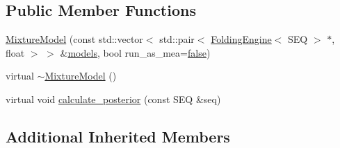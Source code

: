 \subsection*{Public Member Functions}
\begin{DoxyCompactItemize}
\item 
\hyperlink{class_mixture_model_a748180f79cd3465a2737550e49baca9b}{Mixture\+Model} (const std\+::vector$<$ std\+::pair$<$ \hyperlink{class_folding_engine}{Folding\+Engine}$<$ S\+E\+Q $>$ $\ast$, float $>$ $>$ \&\hyperlink{notespace_8cpp_a72a838eeae266b5f9871865050714f94}{models}, bool run\+\_\+as\+\_\+mea=\hyperlink{naview_8c_a65e9886d74aaee76545e83dd09011727}{false})
\item 
virtual \hyperlink{class_mixture_model_ac616d5c6e48a320b4bcaaf32d1053945}{$\sim$\+Mixture\+Model} ()
\item 
virtual void \hyperlink{class_mixture_model_a7388c028012e7058a601b0b32c924d9f}{calculate\+\_\+posterior} (const S\+E\+Q \&seq)
\end{DoxyCompactItemize}
\subsection*{Additional Inherited Members}


